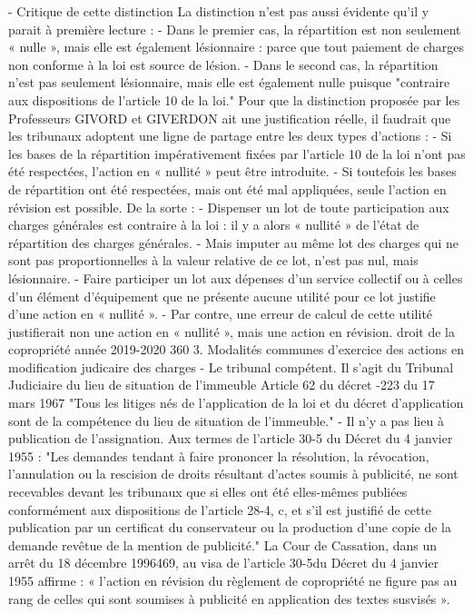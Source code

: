 - Critique de cette distinction
La distinction n'est pas aussi évidente qu'il y parait à première lecture :
- Dans le premier cas, la répartition est non seulement « nulle », mais elle est également lésionnaire : parce que tout paiement de charges non conforme à la loi est source de lésion.
- Dans le second cas, la répartition n'est pas seulement lésionnaire, mais elle est également nulle puisque "contraire aux dispositions de l'article 10 de la loi."
Pour que la distinction proposée par les Professeurs GIVORD et GIVERDON ait une justification réelle, il faudrait que les tribunaux adoptent une ligne de partage entre les deux types d'actions :
- Si les bases de la répartition impérativement fixées par l'article 10 de la loi n'ont pas été respectées, l'action en « nullité » peut être introduite.
- Si toutefois les bases de répartition ont été respectées, mais ont été mal appliquées, seule l'action en révision est possible.
De la sorte :
- Dispenser un lot de toute participation aux charges générales est contraire à la loi : il y a alors « nullité » de l'état de répartition des charges générales.
- Mais imputer au même lot des charges qui ne sont pas proportionnelles à la valeur relative de ce lot, n'est pas nul, mais lésionnaire.
- Faire participer un lot aux dépenses d'un service collectif ou à celles d'un élément d'équipement que ne présente aucune utilité pour ce lot justifie d'une action en « nullité ».
- Par contre, une erreur de calcul de cette utilité justifierait non une action en « nullité », mais une action en révision.
droit de la copropriété année 2019-2020
360
3. Modalités communes d’exercice des actions en modification judicaire des charges
- Le tribunal compétent.
Il s’agit du Tribunal Judiciaire du lieu de situation de l’immeuble
Article 62 du décret -223 du 17 mars 1967
"Tous les litiges nés de l'application de la loi et du décret d'application sont de la compétence du lieu de situation de l'immeuble."
- Il n’y a pas lieu à publication de l'assignation.
Aux termes de l'article 30-5 du Décret du 4 janvier 1955 :
"Les demandes tendant à faire prononcer la résolution, la révocation, l'annulation ou la rescision de droits résultant d'actes soumis à publicité, ne sont recevables devant les tribunaux que si elles ont été elles-mêmes publiées conformément aux dispositions de l'article 28-4\degres, c, et s'il est justifié de cette publication par un certificat du conservateur ou la production d'une copie de la demande revêtue de la mention de publicité."
La Cour de Cassation, dans un arrêt du 18 décembre 1996469, au visa de l’article 30-5\degres du Décret du 4 janvier 1955 affirme : « l’action en révision du règlement de copropriété ne figure pas au rang de celles qui sont soumises à publicité en application des textes susvisés ».
